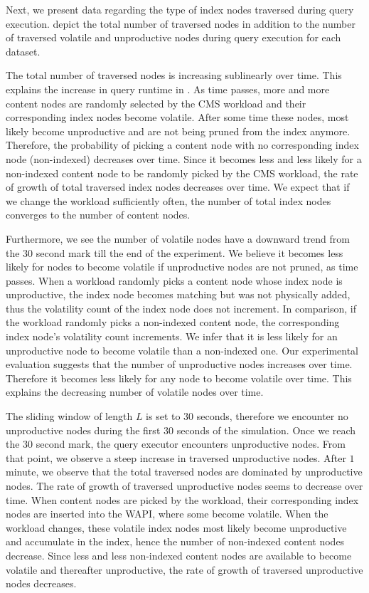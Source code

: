 \documentclass[abstracton,12pt]{scrartcl}
\theoremstyle{definition}
\begin{document}
Next, we present data regarding the type of index nodes traversed during query
execution.
 depict
the total number of traversed nodes in addition to the number of traversed
volatile and unproductive nodes during query execution for each dataset.

The total number of traversed nodes is increasing sublinearly over time. This
explains the increase in query runtime in
.
As time passes, more and more content nodes are randomly
selected by the CMS workload and their corresponding index nodes become
volatile. After some time these nodes, most likely become unproductive and are
not  being pruned from the index anymore.
Therefore, the probability of picking a content node with no corresponding index
node (non-indexed)
decreases over time. Since it becomes less and less likely for a non-indexed content node
to be randomly picked by the CMS workload, the rate of growth of total traversed
index nodes decreases over time. We expect that if we change the workload
sufficiently often, the number of total index nodes converges to the number of
content nodes.

Furthermore, we see the number of volatile nodes have a downward trend from the
30 second mark till the end of the experiment. We believe it becomes less likely
for nodes to become volatile if unproductive nodes are not pruned,
as time passes. When a workload randomly picks a content node whose index node is
unproductive, the index
node becomes matching but was not physically added, thus the volatility count of
the index node
does not increment. In comparison, if the workload randomly picks a non-indexed
content node, the corresponding index node's volatility count increments.
We infer that it is less
likely for an unproductive node to become volatile than a non-indexed one.
Our experimental evaluation suggests that the number of
unproductive nodes increases over time. Therefore it becomes less likely for any
node to become volatile over time. This explains the decreasing number of
volatile nodes over time.

The sliding window of length $L$ is set to $30$ seconds, therefore we encounter no
unproductive nodes during the first $30$ seconds of the simulation. Once we
reach the $30$ second mark, the query executor encounters unproductive nodes.
From that point, we observe a steep increase in traversed unproductive nodes.
After $1$ minute, we observe that the total traversed nodes are dominated by
unproductive nodes. The rate of growth of traversed unproductive nodes seems to
decrease over time. When content nodes are picked by the
workload, their corresponding index nodes are inserted into the WAPI, where some
become volatile. When the workload changes, these volatile index nodes most
likely become unproductive and accumulate in the index, hence the number of non-indexed
content nodes decrease. Since less and less non-indexed content nodes are
available to become volatile and thereafter unproductive, the rate of growth of
traversed unproductive nodes decreases.
\end{document}
